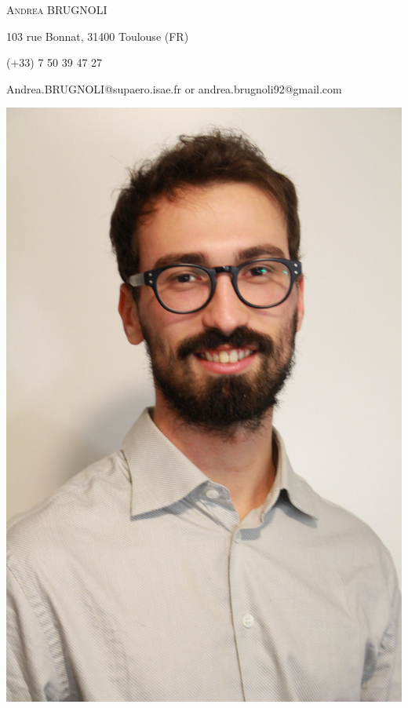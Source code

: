 \documentclass[11pt,a4paper,sans]{moderncv} %
\begin{document}

\begin{minipage}{.8\linewidth}
{\huge{\textsc{Andrea BRUGNOLI}}}

\vspace{2mm}
{103 rue Bonnat, 31400 Toulouse (FR)}

{(+33) 7 50 39 47 27}

{ Andrea.BRUGNOLI@supaero.isae.fr or andrea.brugnoli92@gmail.com}

\vspace{3mm}

\end{minipage}
\begin{minipage}{.2\linewidth}
\begin{center}
\includegraphics[width=0.8\linewidth]{Foto_Cv-min.jpg}
\end{center}
\end{minipage}
\end{document}
